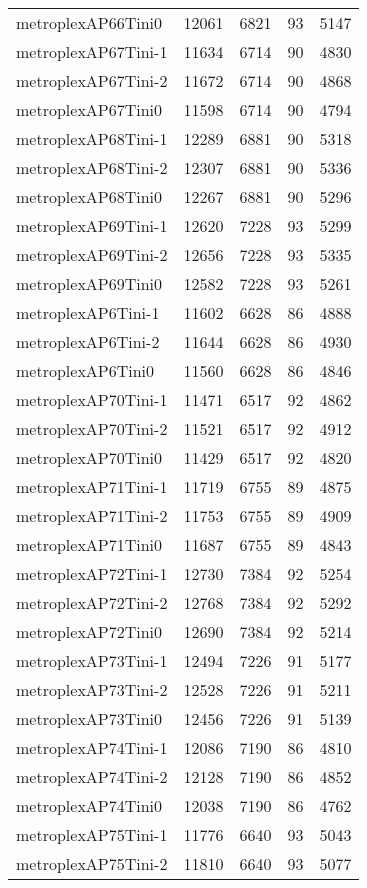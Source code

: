 \begin{longtable}{lrrrr}
metroplexAP66Tini0 & 12061 & 6821 & 93 & 5147 \\
metroplexAP67Tini-1 & 11634 & 6714 & 90 & 4830 \\
metroplexAP67Tini-2 & 11672 & 6714 & 90 & 4868 \\
metroplexAP67Tini0 & 11598 & 6714 & 90 & 4794 \\
metroplexAP68Tini-1 & 12289 & 6881 & 90 & 5318 \\
metroplexAP68Tini-2 & 12307 & 6881 & 90 & 5336 \\
metroplexAP68Tini0 & 12267 & 6881 & 90 & 5296 \\
metroplexAP69Tini-1 & 12620 & 7228 & 93 & 5299 \\
metroplexAP69Tini-2 & 12656 & 7228 & 93 & 5335 \\
metroplexAP69Tini0 & 12582 & 7228 & 93 & 5261 \\
metroplexAP6Tini-1 & 11602 & 6628 & 86 & 4888 \\
metroplexAP6Tini-2 & 11644 & 6628 & 86 & 4930 \\
metroplexAP6Tini0 & 11560 & 6628 & 86 & 4846 \\
metroplexAP70Tini-1 & 11471 & 6517 & 92 & 4862 \\
metroplexAP70Tini-2 & 11521 & 6517 & 92 & 4912 \\
metroplexAP70Tini0 & 11429 & 6517 & 92 & 4820 \\
metroplexAP71Tini-1 & 11719 & 6755 & 89 & 4875 \\
metroplexAP71Tini-2 & 11753 & 6755 & 89 & 4909 \\
metroplexAP71Tini0 & 11687 & 6755 & 89 & 4843 \\
metroplexAP72Tini-1 & 12730 & 7384 & 92 & 5254 \\
metroplexAP72Tini-2 & 12768 & 7384 & 92 & 5292 \\
metroplexAP72Tini0 & 12690 & 7384 & 92 & 5214 \\
metroplexAP73Tini-1 & 12494 & 7226 & 91 & 5177 \\
metroplexAP73Tini-2 & 12528 & 7226 & 91 & 5211 \\
metroplexAP73Tini0 & 12456 & 7226 & 91 & 5139 \\
metroplexAP74Tini-1 & 12086 & 7190 & 86 & 4810 \\
metroplexAP74Tini-2 & 12128 & 7190 & 86 & 4852 \\
metroplexAP74Tini0 & 12038 & 7190 & 86 & 4762 \\
metroplexAP75Tini-1 & 11776 & 6640 & 93 & 5043 \\
metroplexAP75Tini-2 & 11810 & 6640 & 93 & 5077 \\

\end{longtable}
